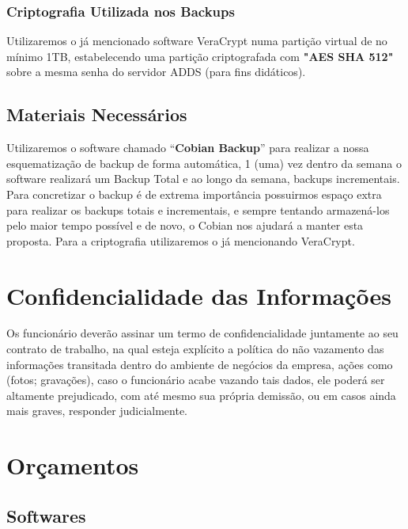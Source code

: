 \documentclass[12pt]{article}
\begin{document}
\subsubsection{Criptografia Utilizada nos Backups}
Utilizaremos o já mencionado software VeraCrypt numa partição virtual de no mínimo 1TB, estabelecendo uma partição criptografada com \textbf{"AES SHA 512"} sobre a mesma senha do servidor ADDS (para fins didáticos).

\subsection{Materiais Necessários}
Utilizaremos o software chamado “\textbf{Cobian Backup}” para realizar a nossa esquematização de backup de forma automática, 1 (uma) vez dentro da semana o software realizará um Backup Total e ao longo da semana, backups incrementais. Para concretizar o backup é de extrema importância possuirmos espaço extra para realizar os backups totais e incrementais, e sempre tentando armazená-los pelo maior tempo possível e de novo, o Cobian nos ajudará a manter esta proposta. Para a criptografia utilizaremos o já mencionando VeraCrypt.

\section{Confidencialidade das Informações}
Os funcionário deverão assinar um termo de confidencialidade juntamente ao seu contrato de trabalho, na qual esteja explícito a política do não vazamento das informações transitada dentro do ambiente de negócios da empresa, ações como (fotos; gravações), caso o funcionário acabe vazando tais dados, ele poderá ser altamente prejudicado, com até mesmo sua própria demissão, ou em casos ainda mais graves, responder judicialmente.

\section{Orçamentos}

\subsection{Softwares}
\end{document}
